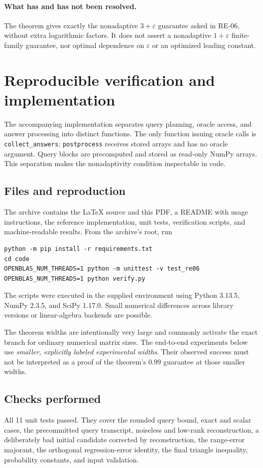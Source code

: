 \documentclass[11pt]{article}
\numberwithin{equation}{section}
\theoremstyle{remark}
\begin{document}
\paragraph{What has and has not been resolved.}
The theorem gives exactly the nonadaptive $3+\varepsilon$ guarantee asked in RE-06, without extra logarithmic factors. It does not assert a nonadaptive $1+\varepsilon$ finite-family guarantee, nor optimal dependence on $\varepsilon$ or an optimized leading constant.

\section{Reproducible verification and implementation}\label{sec:verification}

The accompanying implementation separates query planning, oracle access, and answer processing into distinct functions. The only function issuing oracle calls is \texttt{collect\_answers}; \texttt{postprocess} receives stored arrays and has no oracle argument. Query blocks are precomputed and stored as read-only NumPy arrays. This separation makes the nonadaptivity condition inspectable in code.

\subsection{Files and reproduction}
The archive contains the LaTeX source and this PDF, a README with usage instructions, the reference implementation, unit tests, verification scripts, and machine-readable results. From the archive's root, run
\begin{verbatim}
python -m pip install -r requirements.txt
cd code
OPENBLAS_NUM_THREADS=1 python -m unittest -v test_re06
OPENBLAS_NUM_THREADS=1 python verify.py
\end{verbatim}
The scripts were executed in the supplied environment using Python 3.13.5, NumPy 2.3.5, and SciPy 1.17.0. Small numerical differences across library versions or linear-algebra backends are possible.

The theorem widths are intentionally very large and commonly activate the exact branch for ordinary numerical matrix sizes. The end-to-end experiments below use \emph{smaller, explicitly labeled experimental widths}. Their observed success must not be interpreted as a proof of the theorem's $0.99$ guarantee at those smaller widths.

\subsection{Checks performed}
All 11 unit tests passed. They cover the rounded query bound, exact and scalar cases, the precommitted query transcript, noiseless and low-rank reconstruction, a deliberately bad initial candidate corrected by reconstruction, the range-error majorant, the orthogonal regression-error identity, the final triangle inequality, probability constants, and input validation.
\end{document}
